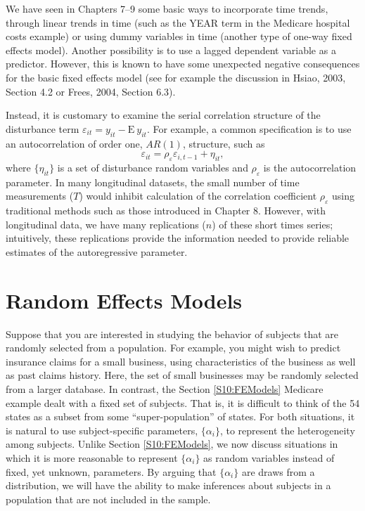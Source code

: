 We have seen in Chapters 7--9 some basic ways to incorporate time
trends, through linear trends in time (such as the YEAR term in the
Medicare hospital costs example) or using dummy variables in time
(another type of one-way fixed effects model). Another possibility
is to use a lagged dependent variable as a predictor. However, this
is known to have some unexpected negative consequences for the basic
fixed effects model (see for example the discussion in Hsiao, 2003,
Section 4.2 or Frees, 2004, Section 6.3).

Instead, it is customary to examine the serial correlation structure
of the disturbance term $ \varepsilon_{it} = y_{it} -
\mathrm{E}~y_{it}.$ For example, a common specification is to use an
autocorrelation of order one, $AR(1)$, structure, such as
\begin{equation*}
\varepsilon_{it} = \rho_{\varepsilon} \varepsilon_{i,t-1} +
\eta_{it},
\end{equation*}
where $\{ \eta_{it} \}$ is a set of disturbance random variables and
$\rho_{\varepsilon}$ is the autocorrelation parameter. In many
longitudinal datasets, the small number of time measurements ($T$)
would inhibit calculation of the correlation coefficient
$\rho_{\varepsilon}$ using traditional methods such as those
introduced in Chapter 8. However, with longitudinal data, we have
many replications ($n$) of these short times series; intuitively,
these replications provide the information needed to provide
reliable estimates of the autoregressive parameter.


\section{Random Effects Models}\label{S10:REModels}


Suppose that you are interested in studying the behavior of subjects
that are randomly selected from a population. For example, you might
wish to predict insurance claims for a small business, using
characteristics of the business as well as past claims history.
Here, the set of small businesses may be randomly selected from a
larger database. In contrast, the Section \ref{S10:FEModels}
Medicare example dealt with a fixed set of subjects. That is, it is
difficult to think of the 54 states as a subset from some
``super-population'' of states. For both situations, it is natural
to use subject-specific parameters, $\{\alpha_i \}$, to represent
the heterogeneity among subjects. Unlike Section \ref{S10:FEModels},
we now discuss situations in which it is more reasonable to
represent $\{\alpha_i \}$ as random variables instead of fixed, yet
unknown, parameters. By arguing that $\{\alpha_i \}$ are draws from
a distribution, we will have the ability to make inferences about
subjects in a population that are not included in the sample.

